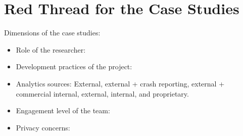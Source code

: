 \section{Red Thread for the Case Studies}
\label{section-case-studies-red-thread}

Dimensions of the case studies:
\begin{itemize}
    \item Role of the researcher:
    \item Development practices of the project:
    \item Analytics sources: External, external + crash reporting, external + commercial internal, external, internal, and proprietary.
    \item Engagement level of the team:
    \item Privacy concerns: 
\end{itemize}